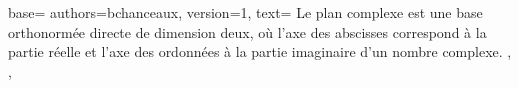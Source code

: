 {
  base={
    authors={bchanceaux},
    version={1},
    text={%
      Le plan complexe est une base orthonormée directe de dimension deux, où l'axe des abscisses correspond à la
partie réelle et l'axe des ordonnées à la partie imaginaire d'un nombre complexe.%
    },
  },
}
